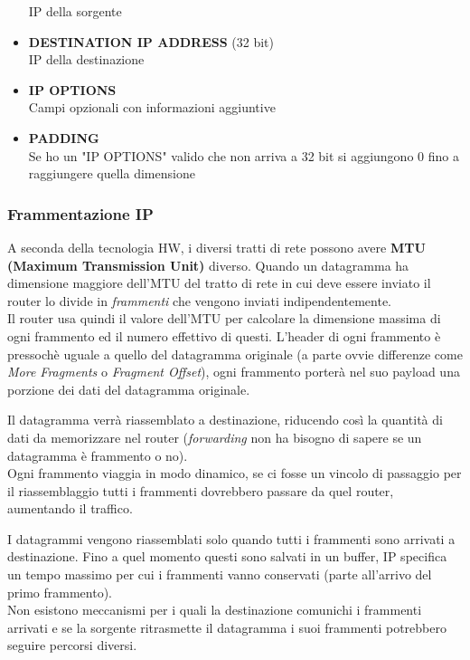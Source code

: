 \documentclass{article}
\newcounter{subsubsubsection}[subsubsection]
\begin{document}
\begin{itemize}
                          IP della sorgente
                    \item \textbf{DESTINATION IP ADDRESS} (32 bit)\\
                          IP della destinazione
                    \item \textbf{IP OPTIONS}\\
                          Campi opzionali con informazioni aggiuntive
                    \item \textbf{PADDING}\\
                          Se ho un "IP OPTIONS" valido che non arriva a 32 bit si aggiungono 0 fino a raggiungere quella dimensione
                \end{itemize}

            \subsubsection{Frammentazione IP}
                A seconda della tecnologia HW, i diversi tratti di rete possono avere \textbf{MTU (Maximum Transmission Unit)} diverso. Quando un datagramma ha dimensione maggiore dell'MTU del tratto di rete in cui deve essere inviato il router lo divide in \textit{frammenti} che vengono inviati indipendentemente.\\
                Il router usa quindi il valore dell'MTU per calcolare la dimensione massima di ogni frammento ed il numero effettivo di questi. L'header di ogni frammento è pressochè uguale a quello del datagramma originale (a parte ovvie differenze come \textit{More Fragments} o \textit{Fragment Offset}), ogni frammento porterà nel suo payload una porzione dei dati del datagramma originale.

                    Il datagramma verrà riassemblato a destinazione, riducendo così la quantità di dati da memorizzare nel router (\textit{forwarding} non ha bisogno di sapere se un datagramma è frammento o no).\\
                    Ogni frammento viaggia in modo dinamico, se ci fosse un vincolo di passaggio per il riassemblaggio tutti i frammenti dovrebbero passare da quel router, aumentando il traffico.

                    I datagrammi vengono riassemblati solo quando tutti i frammenti sono arrivati a destinazione. Fino a quel momento questi sono salvati in un buffer, IP specifica un tempo massimo per cui i frammenti vanno conservati (parte all'arrivo del primo frammento).\\
                    Non esistono meccanismi per i quali la destinazione comunichi i frammenti arrivati e se la sorgente ritrasmette il datagramma i suoi frammenti potrebbero seguire percorsi diversi.
\end{document}
